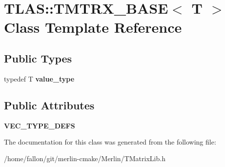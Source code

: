 \hypertarget{classTLAS_1_1TMTRX__BASE}{}\section{T\+L\+AS\+:\+:T\+M\+T\+R\+X\+\_\+\+B\+A\+SE$<$ T $>$ Class Template Reference}
\label{classTLAS_1_1TMTRX__BASE}
\subsection*{Public Types}
\begin{DoxyCompactItemize}
\item 
\mbox{\label{classTLAS_1_1TMTRX__BASE_a4b50fbe1f9341bf11468191e4b8fbac2}} 
typedef T {\bfseries value\+\_\+type}
\end{DoxyCompactItemize}
\subsection*{Public Attributes}
\begin{DoxyCompactItemize}
\item 
\mbox{\label{classTLAS_1_1TMTRX__BASE_a33998955580df9cb5df62a13c810195b}} 
{\bfseries V\+E\+C\+\_\+\+T\+Y\+P\+E\+\_\+\+D\+E\+FS}
\end{DoxyCompactItemize}


The documentation for this class was generated from the following file\+:\begin{DoxyCompactItemize}
\item 
/home/fallon/git/merlin-\/cmake/\+Merlin/T\+Matrix\+Lib.\+h\end{DoxyCompactItemize}
